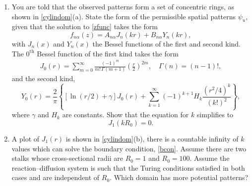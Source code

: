 \documentclass[a4paper, 12pt]{article}
\begin{document}
\begin{enumerate}[label={\bf \arabic{*}.\;}, ref={\arabic{*}},itemsep=3ex, left=0ex]
{\begin{enumerate}[label=(\alph*)]
{            Show that solutions to these eigen-equations take the form
            \begin{equation}
              \psi_{u/v}(r,\theta) = \sum_{n=0}^{\infty}\left[f_{n1}(r)\cos(n\theta) + f_{n2}(r)\sin(n\theta)\right],
            \end{equation}
            where $f_{n\alpha},\alpha= 1,2$ solve the equation
            \begin{equation}
              \label{zfunc}
              \fdd{f_{n\alpha}}{r} + \frac{1}{r}\fd{f_{n\alpha}}{r} + \left(k^2-\frac{n^2}{r^2}\right)f_{n\alpha}=0.
            \end{equation}
          }
        \item{You are told that the observed patterns form a set of concentric rings, as shown in \cref{cylindom}(a). State the form of the permissible spatial patterns $\psi_u$, given that the solution to \cref{zfunc} takes the form
            \begin{equation}
              f_{n\alpha}(z) = A_{n\alpha} J_{n}(k r) + B_{n\alpha} Y_{n}(k r),
            \end{equation}
            with $J_{n}(x)$ and $Y_{n}(x)$ the Bessel functions of the first and second kind. The $0^\text{th}$ Bessel function of the first kind takes the form
            \begin{align}
              J_0(r) = \sum_{m=0}^{\infty}\frac{(-1)^m}{m!\,\Gamma(m+1)}\left(\frac{r}{2}\right)^{2m},\quad  \Gamma(n) = (n-1)!,
            \end{align}
            and the second kind,
            \begin{equation}
              Y_0(r)=\frac{2}{\pi}\left\{[\ln(r/2)+\gamma]J_0(r)+\sum_{k=1}^{\infty}(-1)^{k+1}H_k\frac{(r^2/4)^k}{(k!)^2}\right\},
            \end{equation}
            where $\gamma$ and $H_k$ are constants. Show that the equation for $k$ simplifies to
            \begin{equation}
              \label{bcon}
              J_{1}(k R_0) = 0.
            \end{equation}
          }
        \item{
            A plot of $J_1(r)$ is shown in \cref{cylindom}(b), there is a countable infinity of $k$ values which can solve the boundary condition, \cref{bcon}. Assume there are two stalks whose cross-sectional radii are $R_0=1$ and $R_0=100$. Assume the reaction--diffusion system is such that the Turing conditions satisfied in both cases and are independent of $R_0$. Which domain has more potential patterns?
}
\end{enumerate}}
\end{enumerate}
\end{document}
